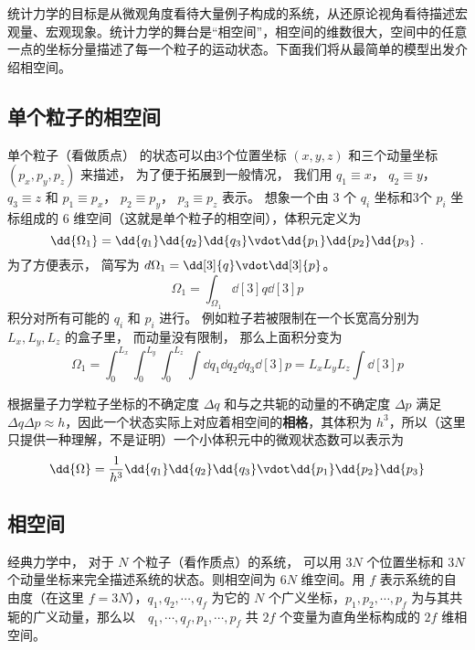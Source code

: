 
统计力学的目标是从微观角度看待大量例子构成的系统，从还原论视角看待描述宏观量、宏观现象。统计力学的舞台是“相空间”，相空间的维数很大，空间中的任意一点的坐标分量描述了每一个粒子的运动状态。下面我们将从最简单的模型出发介绍相空间。

\subsection{单个粒子的相空间}

单个粒子（看做质点） 的状态可以由3个位置坐标 $(x,y,z)$ 和三个动量坐标 $(p_x, p_y, p_z)$ 来描述， 为了便于拓展到一般情况， 我们用 $q_1 \equiv x$，   $q_2 \equiv y$， $q_3 \equiv z$   和 $p_1 \equiv p_x$， $p_2 \equiv p_y$， $p_3 \equiv p_z$ 表示。 想象一个由 3 个 $q_i$  坐标和3个 $p_i$  坐标组成的 $6$ 维空间（这就是单个粒子的相空间），体积元定义为
\begin{equation}
\dd{\Omega_1} = \dd{q_1}\dd{q_2}\dd{q_3} \vdot \dd{p_1}\dd{p_2}\dd{p_3}~.
\end{equation} 
为了方便表示， 简写为  $d{\Omega_1} = \dd[3]{q} \vdot \dd[3]{p}$。 
\begin{equation}
\Omega_1 = \int_{\Omega_1} \dd[3]{q} \dd[3]{p}
\end{equation} 
积分对所有可能的 $q_i$ 和 $p_i$ 进行。 例如粒子若被限制在一个长宽高分别为 $L_x, L_y, L_z$ 的盒子里， 而动量没有限制， 那么上面积分变为
\begin{equation}
\Omega_1 = \int_0^{L_x} \int_0^{L_y} \int_0^{L_z} \int \dd{q_1} \dd{q_2} \dd{q_3} \dd[3]{p} = L_x L_y L_z\int \dd[3]{p} 
\end{equation} 

根据量子力学粒子坐标的不确定度 $\Delta q$ 和与之共轭的动量的不确定度 $\Delta p$ 满足 $\Delta q\Delta p\approx h$，因此一个状态实际上对应着相空间的\textbf{相格}，其体积为 $h^3$，所以（这里只提供一种理解，不是证明）一个小体积元中的微观状态数可以表示为
\begin{equation}
\dd{\Omega}=\frac{1}{h^3}\dd{q_1}\dd{q_2}\dd{q_3} \vdot \dd{p_1}\dd{p_2}\dd{p_3}
\end{equation}

\subsection{相空间}
经典力学中， 对于 $N$ 个粒子（看作质点）的系统， 可以用 $3N$ 个位置坐标和 $3N$ 个动量坐标来完全描述系统的状态。则相空间为 $6N$ 维空间。用 $f$ 表示系统的自由度（在这里 $f=3N$），$q_1,q_2,\cdots,q_f$ 为它的 $N$ 个广义坐标，$p_1,p_2,\cdots,p_f$ 为与其共轭的广义动量，那么以　$q_1,\cdots,q_f,p_1,\cdots,p_f$ 共 $2f$ 个变量为直角坐标构成的 $2f$ 维相空间。

